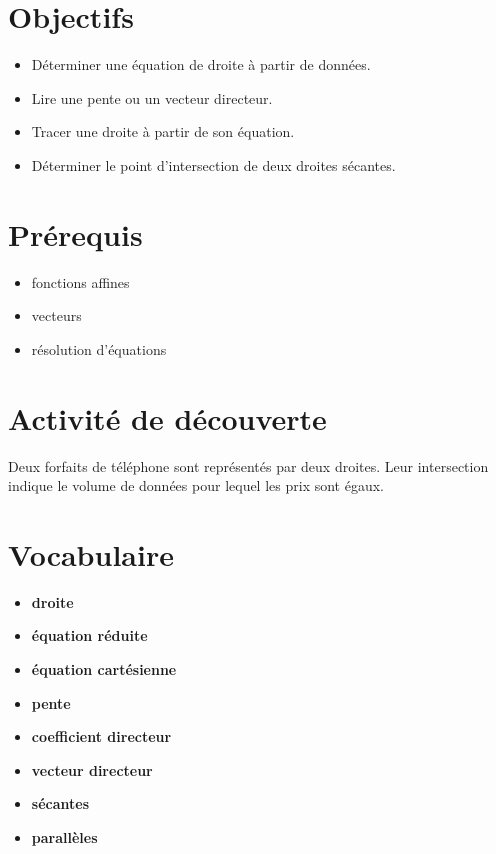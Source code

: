 \section{Objectifs}

\begin{itemize}
\item Déterminer une équation de droite à partir de données.
\item Lire une pente ou un vecteur directeur.
\item Tracer une droite à partir de son équation.
\item Déterminer le point d'intersection de deux droites sécantes.
\end{itemize}

\section{Prérequis}

\begin{itemize}
\item fonctions affines
\item vecteurs
\item résolution d'équations
\end{itemize}

\section{Activité de découverte}

Deux forfaits de téléphone sont représentés par deux droites. Leur intersection indique le volume de données pour lequel les prix sont égaux.

\section{Vocabulaire}

\begin{itemize}
\item \textbf{droite}
\item \textbf{équation réduite}
\item \textbf{équation cartésienne}
\item \textbf{pente}
\item \textbf{coefficient directeur}
\item \textbf{vecteur directeur}
\item \textbf{sécantes}
\item \textbf{parallèles}
\end{itemize}

